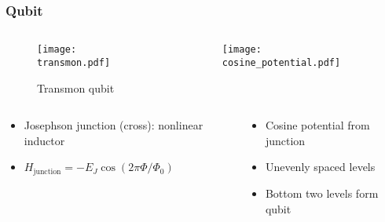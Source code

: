 \begin{frame}
\frametitle{Qubit}
\begin{columns}
  \begin{column}{0.5\textwidth}
    \begin{figure}
      \texttt{[image: transmon.pdf]}
      \caption*{Transmon qubit}
    \end{figure}
  \end{column}
  \begin{column}{0.5\textwidth}
    \begin{figure}
      \texttt{[image: cosine\_potential.pdf]}
    \end{figure}
  \end{column}
\end{columns}
\begin{columns}
  \begin{column}{0.5\textwidth}
    \begin{itemize}
      \item Josephson junction (cross): nonlinear inductor
      \item $H_\text{junction} = - E_J \cos(2\pi \Phi / \Phi_0)$
    \end{itemize}
  \end{column}
  \begin{column}{0.5\textwidth}
    \begin{itemize}
      \item Cosine potential from junction
      \item Unevenly spaced levels
      \item Bottom two levels form qubit
    \end{itemize}
  \end{column}
\end{columns}
\end{frame}

